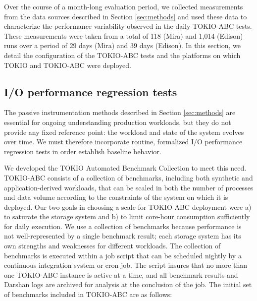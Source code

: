 Over the course of a month-long evaluation period, we collected measurements from the data sources described in Section \ref{sec:methods} and used these data to characterize the performance variability observed in the daily TOKIO-ABC tests.
These measurements were taken from a total of 118 (Mira) and 1,014 (Edison) runs over a period of 29 days (Mira) and 39 days (Edison).
In this section, we detail the configuration of the TOKIO-ABC tests and the platforms on which TOKIO and TOKIO-ABC were deployed.

\subsection{I/O performance regression tests} \label{sec:methods/tests}

The passive instrumentation methods described in Section \ref{sec:methods} are essential for ongoing understanding production workloads, but they do not provide any fixed reference point:
the workload and state of the system evolves over time.
We must therefore incorporate
routine, formalized I/O performance regression tests in order establish baseline behavior.

We developed the TOKIO Automated Benchmark Collection to meet
this need.
TOKIO-ABC consists of a collection of benchmarks, including
both synthetic and application-derived workloads, that can be scaled in
both the number of processes and data volume according to the constraints
of the system on which it is deployed.
Our two goals in choosing a scale for TOKIO-ABC deployment were
a) to saturate the storage system and
b) to limit core-hour consumption sufficiently for daily execution.
We use
a collection of benchmarks because performance is not well-represented
by a single benchmark result; each storage system has its own strengths
and weaknesses for different workloads.  The collection of benchmarks is
executed within a job script that can be scheduled nightly by a continuous
integration system or cron job.  The script insures that no more than
one TOKIO-ABC instance is active at a time, and all benchmark results
and Darshan logs are archived for analysis at the conclusion of the job.
The initial set of benchmarks included in TOKIO-ABC are as follows:

